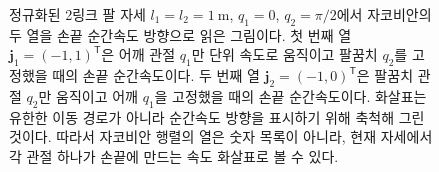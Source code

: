 \begin{figure}[!htbp]
{%
  }
  \caption{정규화된 2링크 팔 자세 \(l_1=l_2=1~\mathrm{m}\), \(q_1=0\), \(q_2=\pi/2\)에서 자코비안의 두 열을 손끝 순간속도 방향으로 읽은 그림이다. 첫 번째 열 \(\bm{j}_1=(-1,1)^{\mathsf T}\)은 어깨 관절 \(q_1\)만 단위 속도로 움직이고 팔꿈치 \(q_2\)를 고정했을 때의 손끝 순간속도이다. 두 번째 열 \(\bm{j}_2=(-1,0)^{\mathsf T}\)은 팔꿈치 관절 \(q_2\)만 움직이고 어깨 \(q_1\)을 고정했을 때의 손끝 순간속도이다. 화살표는 유한한 이동 경로가 아니라 순간속도 방향을 표시하기 위해 축척해 그린 것이다. 따라서 자코비안 행렬의 열은 숫자 목록이 아니라, 현재 자세에서 각 관절 하나가 손끝에 만드는 속도 화살표로 볼 수 있다.}
  \label{fig:two-link-jacobian-columns}
\end{figure}
